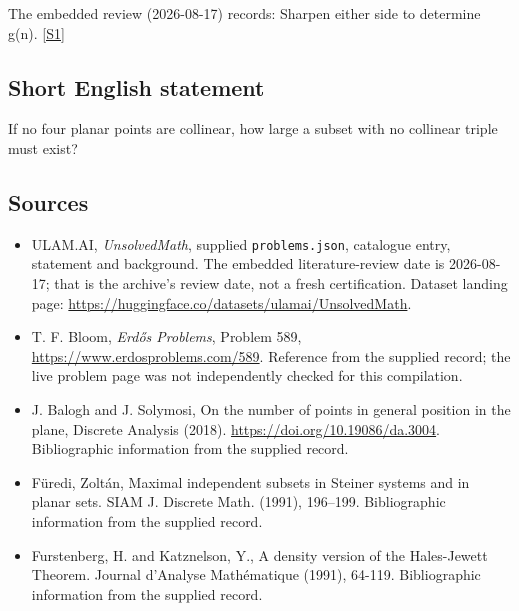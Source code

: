 \documentclass[11pt,a4paper]{article}
\newcommand{\sref}[2]{\hyperlink{source:#1:#2}{[S#2]}}
\begin{document}
The embedded review (2026-08-17) records: Sharpen either side to determine g(n). \sref{statement}{1}

\subsection{Short English statement}

If no four planar points are collinear, how large a subset with no collinear triple must exist?

\subsection{Sources}

{\small

\begin{itemize}

\item[\hypertarget{source:statement:1}{S1}] ULAM.AI, \emph{UnsolvedMath}, supplied \texttt{problems.json}, catalogue entry, statement and background. The embedded literature-review date is 2026-08-17; that is the archive’s review date, not a fresh certification. Dataset landing page: \url{https://huggingface.co/datasets/ulamai/UnsolvedMath}.

\item[\hypertarget{source:statement:2}{S2}] T. F. Bloom, \emph{Erdős Problems}, Problem 589, \url{https://www.erdosproblems.com/589}. Reference from the supplied record; the live problem page was not independently checked for this compilation.

\item[\hypertarget{source:statement:3}{S3}] J. Balogh and J. Solymosi, On the number of points in general position in the plane, Discrete Analysis (2018). \url{https://doi.org/10.19086/da.3004}. Bibliographic information from the supplied record.

\item[\hypertarget{source:statement:4}{S4}] F\"{u}redi, Zolt\'an, Maximal independent subsets in {S}teiner systems and in planar sets. SIAM J. Discrete Math. (1991), 196--199. Bibliographic information from the supplied record.

\item[\hypertarget{source:statement:5}{S5}] Furstenberg, H. and Katznelson, Y., A density version of the Hales-Jewett Theorem. Journal d'Analyse Math\'{e}matique (1991), 64-119. Bibliographic information from the supplied record.

\end{itemize}

}

\label{end:statement}
\end{document}
